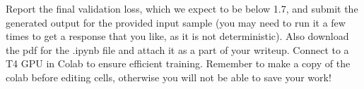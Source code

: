 Report the final validation loss, which we expect to be below 1.7, and submit the generated output for the provided input sample (you may need to run it a few times to get a response that you like, as it is not deterministic). Also download the pdf for the .ipynb file and attach it as a part of your writeup. Connect to a T4 GPU in Colab to ensure efficient training. Remember to make a copy of the colab before editing cells, otherwise you will not be able to save your work! 

\ifnum{} {

} \fi